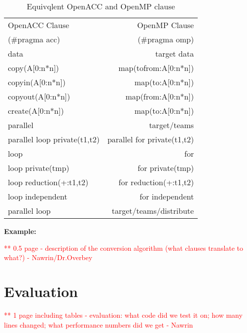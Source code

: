 \documentclass{sig-alternate-05-2015}
\newcommand\todo[1]{\textcolor{red}{** #1}}
\begin{document}
\begin{table}[t]
	\begin{minipage}{0.47\textwidth}
\caption{Equivqlent OpenACC and OpenMP clause}
\centering
\begin{tabular}{ | l@{\hspace{0.1cm}}|  @{\hspace{0.4cm}}r@{\hspace{0.1cm}}|} 
 \hline
 \hspace*{0.4cm} OpenACC Clause & OpenMP Clause\hspace*{0.6cm}\\
 \hspace*{0.5cm} (\#pragma acc)%
  & (\#pragma omp)\hspace*{0.6cm} \\
 \hline
 data & target data \\ 
 copy(A[0:n*n]) & map(tofrom:A[0:n*n]) \\
 copyin(A[0:n*n]) & map(to:A[0:n*n]) \\
 copyout(A[0:n*n]) & map(from:A[0:n*n]) \\
 create(A[0:n*n]) & map(to:A[0:n*n]) \\ 
 parallel & target/teams \\ 
 parallel loop private(t1,t2) & parallel for private(t1,t2) \\
 loop & for \\
 loop private(tmp) & for private(tmp) \\
 loop reduction(+:t1,t2) & for reduction(+:t1,t2) \\
 loop independent & for independent \\
 parallel loop & target/teams/distribute \\
 \hline
\end{tabular}

\label{table:1}
\end{minipage}
\end{table}


\textbf{Example:}

\todo{0.5 page - description of the conversion algorithm (what clauses translate to what?) - Nawrin/Dr.Overbey} 
\section{Evaluation}
\todo{1 page including tables - evaluation: what code did we test it on; how many lines changed; what performance numbers did we get - Nawrin}
\end{document}
